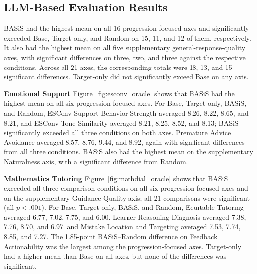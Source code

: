 \documentclass[manuscript,review,anonymous]{acmart}
\begin{document}
\subsection{LLM-Based Evaluation Results}

BASiS had the highest mean on all 16 progression-focused axes and significantly exceeded Base, Target-only, and Random on 15, 11, and 12 of them, respectively. It also had the highest mean on all five supplementary general-response-quality axes, with significant differences on three, two, and three against the respective conditions. Across all 21 axes, the corresponding totals were 18, 13, and 15 significant differences. Target-only did not significantly exceed Base on any axis.

\noindent\textbf{Emotional Support}\quad
Figure~\ref{fig:esconv_oracle} shows that BASiS had the highest mean on all six progression-focused axes. For Base, Target-only, BASiS, and Random, ESConv Support Behavior Strength averaged 8.26, 8.22, 8.65, and 8.21, and ESConv Tone Similarity averaged 8.21, 8.25, 8.52, and 8.13; BASiS significantly exceeded all three conditions on both axes. Premature Advice Avoidance averaged 8.57, 8.76, 9.44, and 8.92, again with significant differences from all three conditions. BASiS also had the highest mean on the supplementary Naturalness axis, with a significant difference from Random.

\noindent\textbf{Mathematics Tutoring}\quad
Figure~\ref{fig:mathdial_oracle} shows that BASiS exceeded all three comparison conditions on all six progression-focused axes and on the supplementary Guidance Quality axis; all 21 comparisons were significant (all $p<.001$). For Base, Target-only, BASiS, and Random, Equitable Tutoring averaged 6.77, 7.02, 7.75, and 6.00. Learner Reasoning Diagnosis averaged 7.38, 7.76, 8.70, and 6.97, and Mistake Location and Targeting averaged 7.53, 7.74, 8.85, and 7.27. The 1.85-point BASiS--Random difference on Feedback Actionability was the largest among the progression-focused axes. Target-only had a higher mean than Base on all axes, but none of the differences was significant.
\end{document}
